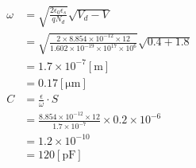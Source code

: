 \documentclass{classes/report}
\begin{document}
\begin{equation}
    \begin{split}
        \omega & = \sqrt{\frac{2\epsilon_0 \epsilon_s}{qN_d}} \sqrt{V_d - V}                                                                   \\
               & = \sqrt{\frac{2 \times 8.854 \times 10^{-12} \times 12}{1.602 \times 10^{-19} \times 10^{17} \times 10^{6}}} \sqrt{0.4 + 1.8} \\
               & = 1.7 \times 10^{-7} [\mathrm{m}]                                                                                             \\
               & = 0.17 [\mathrm{\mu m}]                                                                                                       \\
        C      & = \frac{\epsilon}{\omega} \cdot S                                                                                             \\
               & = \frac{8.854 \times 10^{-12} \times 12}{1.7 \times 10^{-7}} \times 0.2 \times 10^{-6}                                        \\
               & = 1.2 \times 10^{-10}                                                                                                         \\
               & = 120 [\mathrm{pF}]
    \end{split}
\end{equation}
\end{document}
